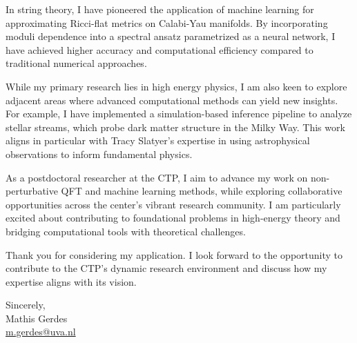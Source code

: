 \documentclass[11pt]{article}
\begin{document}
In string theory, I have pioneered the application of machine learning for approximating Ricci-flat metrics on Calabi-Yau manifolds. By incorporating moduli dependence into a spectral ansatz parametrized as a neural network, I have achieved higher accuracy and computational efficiency compared to traditional numerical approaches.

While my primary research lies in high energy physics, I am also keen to explore adjacent areas where advanced computational methods can yield new insights. For example, I have implemented a simulation-based inference pipeline to analyze stellar streams, which probe dark matter structure in the Milky Way. This work aligns in particular with Tracy Slatyer's expertise in using astrophysical observations to inform fundamental physics.

As a postdoctoral researcher at the CTP, I aim to advance my work on non-perturbative QFT and machine learning methods, while exploring collaborative opportunities across the center's vibrant research community. I am particularly excited about contributing to foundational problems in high-energy theory and bridging computational tools with theoretical challenges.

Thank you for considering my application. I look forward to the opportunity to contribute to the CTP's dynamic research environment and discuss how my expertise aligns with its vision.


\noindent
\flushright
Sincerely, \\
Mathis Gerdes \\
\href{mailto:m.gerdes@uva.nl}{m.gerdes@uva.nl}
\end{document}
